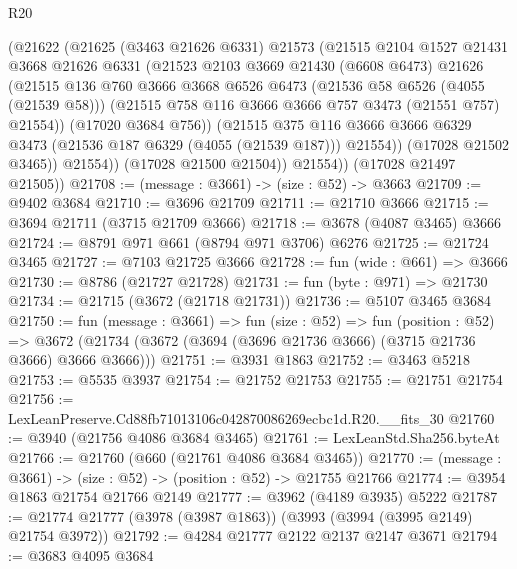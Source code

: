 \begin{lexlean}{R20}
\begin{coremodule}
              (@21622
                (@21625
                  (@3463 @21626 @6331)
                  @21573
                  (@21515
                    @2104
                    @1527
                    @21431
                    @3668
                    @21626
                    @6331
                    (@21523
                      @2103
                      @3669
                      @21430
                      (@6608 @6473)
                      @21626
                      (@21515
                        @136
                        @760
                        @3666
                        @3668
                        @6526
                        @6473
                        (@21536 @58 @6526 (@4055 (@21539 @58)))
                        (@21515 @758 @116 @3666 @3666 @757 @3473 (@21551 @757) @21554))
                      (@17020 @3684 @756))
                    (@21515
                      @375
                      @116
                      @3666
                      @3666
                      @6329
                      @3473
                      (@21536 @187 @6329 (@4055 (@21539 @187)))
                      @21554))
                  (@17028 @21502 @3465))
                @21554))
            (@17028 @21500 @21504))
          @21554))
      (@17028 @21497 @21505))
@21708 := (message : @3661) -> (size : @52) -> @3663
@21709 := @9402 @3684
@21710 := @3696 @21709
@21711 := @21710 @3666
@21715 := @3694 @21711 (@3715 @21709 @3666)
@21718 := @3678 (@4087 @3465) @3666
@21724 := @8791 @971 @661 (@8794 @971 @3706) @6276
@21725 := @21724 @3465
@21727 := @7103 @21725 @3666
@21728 := fun (wide : @661) => @3666
@21730 := @8786 (@21727 @21728)
@21731 := fun (byte : @971) => @21730
@21734 := @21715 (@3672 (@21718 @21731))
@21736 := @5107 @3465 @3684
@21750 := fun (message : @3661) =>
  fun (size : @52) =>
  fun (position : @52) =>
  @3672 (@21734 (@3672 (@3694 (@3696 @21736 @3666) (@3715 @21736 @3666) @3666 @3666)))
@21751 := @3931 @1863
@21752 := @3463 @5218
@21753 := @5535 @3937
@21754 := @21752 @21753
@21755 := @21751 @21754
@21756 := LexLeanPreserve.Cd88fb71013106c042870086269ecbc1d.R20.__fits_30
@21760 := @3940 (@21756 @4086 @3684 @3465)
@21761 := LexLeanStd.Sha256.byteAt
@21766 := @21760 (@660 (@21761 @4086 @3684 @3465))
@21770 := (message : @3661) -> (size : @52) -> (position : @52) -> @21755 @21766
@21774 := @3954 @1863 @21754 @21766 @2149
@21777 := @3962 (@4189 @3935) @5222
@21787 := @21774 @21777 (@3978 (@3987 @1863)) (@3993 (@3994 (@3995 @2149) @21754 @3972))
@21792 := @4284 @21777 @2122 @2137 @2147 @3671
@21794 := @3683 @4095 @3684

\end{coremodule}
\end{lexlean}
